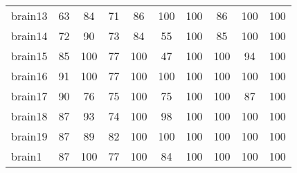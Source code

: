 \begin{adjustbox}{width=\textwidth}
\begin{tabular}{|l|ccc|ccc|ccc|}
	brain13                                                    & 63                   & 84                   & 71                    & 86                            & 100                          & 100                           & 86                              & 100                             & 100                              \\
	brain14                                                    & 72                   & 90                   & 73                    & 84                            & 55                           & 100                           & 85                              & 100                             & 100                              \\
	brain15                                                    & 85                   & 100                  & 77                    & 100                           & 47                           & 100                           & 100                             & 94                              & 100                              \\
	brain16                                                    & 91                   & 100                  & 77                    & 100                           & 100                          & 100                           & 100                             & 100                             & 100                              \\
	brain17                                                    & 90                   & 76                   & 75                    & 100                           & 75                           & 100                           & 100                             & 87                              & 100                              \\
	brain18                                                    & 87                   & 93                   & 74                    & 100                           & 98                           & 100                           & 100                             & 100                             & 100                              \\
	brain19                                                    & 87                   & 89                   & 82                    & 100                           & 100                          & 100                           & 100                             & 100                             & 100                              \\
	brain1                                                     & 87                   & 100                  & 77                    & 100                           & 84                           & 100                           & 100                             & 100                             & 100                              \\

\end{tabular}
\end{adjustbox}
